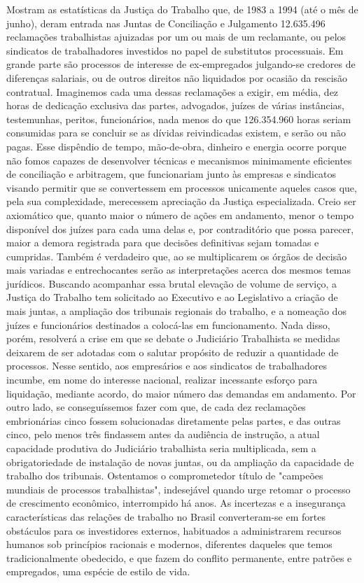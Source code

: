 Mostram as estatísticas da Justiça do Trabalho que, de 1983 a 1994 (até o mês de junho), deram entrada nas Juntas de Conciliação e Julgamento 12.635.496 reclamações trabalhistas ajuizadas por um ou mais de um reclamante, ou pelos sindicatos de trabalhadores investidos no papel de substitutos processuais.
Em grande parte são processos de interesse de ex-empregados julgando-se credores de diferenças salariais, ou de outros direitos não liquidados por ocasião da rescisão contratual.
Imaginemos cada uma dessas reclamações a exigir, em média, dez horas de dedicação exclusiva das partes, advogados, juízes de várias instâncias, testemunhas, peritos, funcionários, nada menos do que 126.354.960 horas seriam consumidas para se concluir se as dívidas reivindicadas existem, e serão ou não pagas.
Esse dispêndio de tempo, mão-de-obra, dinheiro e energia ocorre porque não fomos capazes de desenvolver técnicas e mecanismos minimamente eficientes de conciliação e arbitragem, que funcionariam junto às empresas e sindicatos visando permitir que se convertessem em processos unicamente aqueles casos que, pela sua complexidade, merecessem apreciação da Justiça especializada.
Creio ser axiomático que, quanto maior o número de ações em andamento, menor o tempo disponível dos juízes para cada uma delas e, por contraditório que possa parecer, maior a demora registrada para que decisões definitivas sejam tomadas e cumpridas.
Também é verdadeiro que, ao se multiplicarem os órgãos de decisão mais variadas e entrechocantes serão as interpretações acerca dos mesmos temas jurídicos.
Buscando acompanhar essa brutal elevação de volume de serviço, a Justiça do Trabalho tem solicitado ao Executivo e ao Legislativo a criação de mais juntas, a ampliação dos tribunais regionais do trabalho, e a nomeação dos juízes e funcionários destinados a colocá-las em funcionamento.
Nada disso, porém, resolverá a crise em que se debate o Judiciário Trabalhista se medidas deixarem de ser adotadas com o salutar propósito de reduzir a quantidade de processos. Nesse sentido, aos empresários e aos sindicatos de trabalhadores incumbe, em nome do interesse nacional, realizar incessante esforço para liquidação, mediante acordo, do maior número das demandas em andamento.
Por outro lado, se conseguíssemos fazer com que, de cada dez reclamações embrionárias cinco fossem solucionadas diretamente pelas partes, e das outras cinco, pelo menos três findassem antes da audiência de instrução, a atual capacidade produtiva do Judiciário trabalhista seria multiplicada, sem a obrigatoriedade de instalação de novas juntas, ou da ampliação da capacidade de trabalho dos tribunais.
Ostentamos o comprometedor título de "campeões mundiais de processos trabalhistas", indesejável quando urge retomar o processo de crescimento econômico, interrompido há anos.
As incertezas e a insegurança características das relações de trabalho no Brasil converteram-se em fortes obstáculos para os investidores externos, habituados a administrarem recursos humanos sob princípios racionais e modernos, diferentes daqueles que temos tradicionalmente obedecido, e que fazem do conflito permanente, entre patrões e empregados, uma espécie de estilo de vida.


